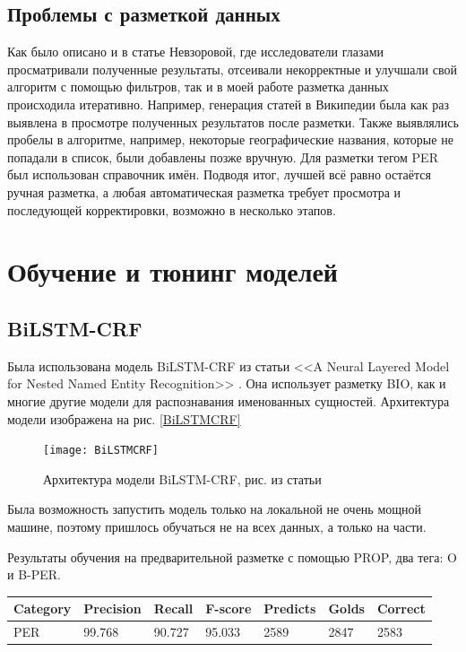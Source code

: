 \subsection{Проблемы с разметкой данных}

Как было описано и в статье Невзоровой, где исследователи глазами просматривали полученные результаты, отсеивали некорректные и улучшали свой алгоритм с помощью фильтров, так и в моей работе разметка данных происходила итеративно. Например, генерация статей в Википедии была как раз выявлена в просмотре полученных результатов после разметки. Также выявлялись пробелы в алгоритме, например, некоторые географические названия, которые не попадали в список, были добавлены позже вручную. Для разметки тегом PER был использован справочник имён. Подводя итог, лучшей всё равно остаётся ручная разметка, а любая автоматическая разметка требует просмотра и последующей корректировки, возможно в несколько этапов.

\section{Обучение и тюнинг моделей}

\subsection{BiLSTM-CRF}

Была использована модель BiLSTM-CRF из статьи <<A Neural Layered Model for Nested Named Entity Recognition>> \cite{ju-etal-2018-neural}. Она использует разметку BIO, как и многие другие модели для распознавания именованных сущностей. Архитектура модели изображена на рис. \ref{BiLSTMCRF}

\begin{figure}[H]
\caption{Архитектура модели BiLSTM-CRF, рис. из статьи \cite{ju-etal-2018-neural}}
\texttt{[image: BiLSTMCRF]}
\label{fig:BiLSTMCRF}
\end{figure}




Была возможность запустить модель только на локальной не очень мощной машине, поэтому пришлось обучаться не на всех данных, а только на части.

Результаты обучения на предварительной разметке с помощью PROP, два тега: O и B-PER.

\medskip

\begin{tabular}{| l | l | l | l | l | l | l |}
\hline
Category               & Precision  &   Recall   &  F-score   &  Predicts  &   Golds    &  Correct   \\

\hline
 PER                                 & 99.768     & 90.727     & 95.033     & 2589       & 2847       & 2583       \\
\hline
\end{tabular}





